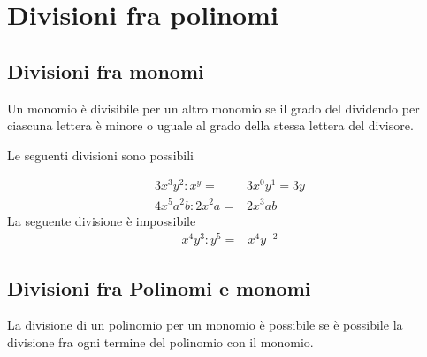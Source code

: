 \chapter{Divisioni fra polinomi}
\label{cha:Divisionipolinomi}
\section{Divisioni fra monomi}
Un monomio è divisibile per un altro monomio se il grado del dividendo per ciascuna lettera è minore o uguale al grado della stessa lettera del divisore.
\begin{esempiot}{}{}
Le seguenti divisioni sono possibili
\end{esempiot}
\begin{align*}
3x^3y^2:x^y=&3x^0y^1=3y\\
4x^5a^2b:2x^2a=&2x^3ab
\end{align*}
La seguente divisione è impossibile
\begin{align*}
x^4y^3:y^5=&x^4y^{-2}
\end{align*}
\section{Divisioni fra Polinomi e monomi}
La divisione di un polinomio per un monomio è possibile se è possibile la divisione fra ogni termine del polinomio con il monomio.

